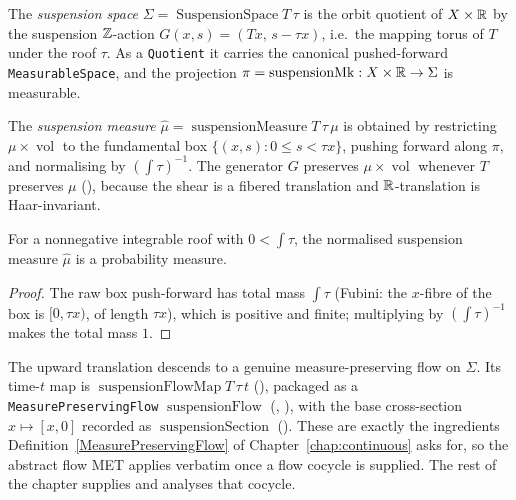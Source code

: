 \begin{definition}\label{thm:susp-space}
  \leanok
  The \emph{suspension space} $\Sigma = \operatorname{SuspensionSpace} T\,\tau$ is the orbit
  quotient of $X \times \mathbb{R}$ by the suspension $\mathbb{Z}$-action $G(x, s) = (Tx,\, s - \tau x)$,
  i.e.\ the mapping torus of $T$ under the roof $\tau$. As a \texttt{Quotient} it carries the
  canonical pushed-forward \texttt{MeasurableSpace}, and the projection
  $\pi = \operatorname{suspensionMk} : X \times \mathbb{R} \to \Sigma$ is measurable.
\end{definition}

\begin{definition}\label{thm:susp-measure}
  \leanok
  The \emph{suspension measure} $\hat\mu = \operatorname{suspensionMeasure} T\,\tau\,\mu$ is
  obtained by restricting $\mu \times \operatorname{vol}$ to the fundamental box
  $\{(x, s) : 0 \le s < \tau x\}$, pushing forward along $\pi$, and normalising by
  $(\int\tau)^{-1}$. The generator $G$ preserves $\mu \times \operatorname{vol}$ whenever $T$
  preserves $\mu$ (), because the shear is
  a fibered translation and $\mathbb{R}$-translation is Haar-invariant.
\end{definition}

\begin{theorem}\label{thm:susp-prob}
  \leanok
  For a nonnegative integrable roof with $0 < \int\tau$, the normalised suspension measure
  $\hat\mu$ is a probability measure.
\end{theorem}
\begin{proof}\leanok
  The raw box push-forward has total mass $\int\tau$ (Fubini: the $x$-fibre of the box is
  $[0, \tau x)$, of length $\tau x$), which is positive and finite; multiplying by
  $(\int\tau)^{-1}$ makes the total mass $1$.
\end{proof}

The upward translation descends to a genuine measure-preserving flow on $\Sigma$. Its time-$t$
map is $\operatorname{suspensionFlowMap} T\,\tau\,t$
(), packaged as a \texttt{MeasurePreservingFlow}
$\operatorname{suspensionFlow}$ (,
), with the base cross-section
$x \mapsto [x, 0]$ recorded as $\operatorname{suspensionSection}$
(). These are exactly the ingredients
Definition~\ref{MeasurePreservingFlow} of Chapter~\ref{chap:continuous} asks for, so the
abstract flow MET applies verbatim once a flow cocycle is supplied. The rest of the chapter
supplies and analyses that cocycle.

